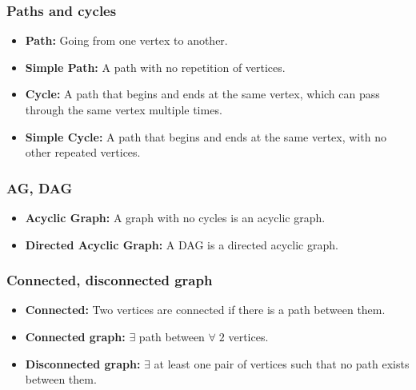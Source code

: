 
    \subsubsection{Paths and cycles}
    \begin{terminology}
        \begin{itemize}
            \item \textbf{Path:} Going from one vertex to another. 
            
            \item \textbf{Simple Path:} A path with no repetition of vertices.
            
            \item \textbf{Cycle:} A path that begins and ends at the same vertex, which can pass through the same vertex multiple times.

            \item \textbf{Simple Cycle:} A path that begins and ends at the same vertex, with no other repeated vertices.
        \end{itemize}
    \end{terminology}

    \subsubsection{AG, DAG}
    \begin{terminology}
        \begin{itemize}
            \item \textbf{Acyclic Graph:} A graph with no cycles is an acyclic graph.
            \item \textbf{Directed Acyclic Graph:} A DAG is a directed acyclic graph. 
        \end{itemize}
    \end{terminology}

    \subsubsection{Connected, disconnected graph}
    \begin{terminology}
        \begin{itemize}
            \item \textbf{Connected:} Two vertices are connected if there is a path between them.
            \item \textbf{Connected graph:} $\exists$ path between $\forall \; 2$ vertices.
            \item \textbf{Disconnected graph:} $\exists$ at least one pair of vertices such that no path exists between them.
        \end{itemize}
    \end{terminology}

